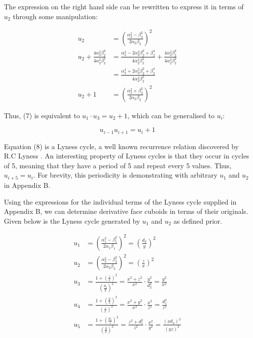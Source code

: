 \documentclass[11pt]{article}
\begin{document}
The expression on the right hand side can be rewritten to express it in terms of $u_2$ through some manipulation:

\begin{equation*}
\begin{aligned}
u_2&=\left(\frac{\alpha_2^2-\beta_2^2}{2\alpha_2\beta_2}\right)^2 \\
u_2+\frac{4\alpha_2^2\beta_2^2}{4\alpha_2^2\beta_2^2}&=\frac{\alpha_2^4-2\alpha_2^2\beta_2^2+\beta_2^4}{4\alpha_2^2\beta_2^2}+\frac{4\alpha_2^2\beta_2^2}{4\alpha_2^2\beta_2^2} \\
&=\frac{\alpha_2^4+2\alpha_2^2\beta_2^2+\beta_2^4}{4\alpha_2^2\beta_2^2} \\
u_2+1&=\left(\frac{\alpha_2^2+\beta_2^2}{2\alpha_2\beta_2}\right)^2
\end{aligned}
\end{equation*}

Thus, (7) is equivalent to $u_1\cdot{u_3}=u_2+1$, which can be generalised to $u_i$:

\begin{equation}
u_{i-1}u_{i+1}=u_i+1
\end{equation}

Equation (8) is a Lyness cycle, a well known recurrence relation discovered by R.C Lyness \cite{lyness}. An interesting property of Lyness cycles is that they occur in cycles of 5, meaning that they have a period of 5 and repeat every 5 values. Thus, $u_{i+5}=u_i$. For brevity, this periodicity is demonstrating with arbitrary $u_1$ and $u_2$ in Appendix B.

Using the expressions for the individual terms of the Lyness cycle supplied in Appendix B, we can determine derivative face cuboids in terms of their originals. Given below is the Lyness cycle generated by $u_1$ and $u_2$ as defined prior.

\begin{equation*}
\begin{aligned}
u_1&=\left(\frac{\alpha_1^2-\beta_1^2}{2\alpha_1\beta_1}\right)^2=\left(\frac{d_2}{y}\right)^2 \\
u_2&=\left(\frac{\alpha_2^2-\beta_2^2}{2\alpha_2\beta_2}\right)^2=\left(\frac{z}{x}\right)^2 \\
u_3&=\frac{1+\left(\frac{z}{x}\right)^2}{\left(\frac{d_2}{y}\right)^2}=\frac{x^2+z^2}{x^2}\cdot\frac{y^2}{d_2^2}=\frac{y^2}{x^2} \\
u_4&=\frac{1+\left(\frac{y}{x}\right)^2}{\left(\frac{z}{x}\right)^2}=\frac{x^2+y^2}{x^2}\cdot\frac{x^2}{z^2}=\frac{d_1^2}{z^2} \\
u_5&=\frac{1+\left(\frac{d_1}{z}\right)^2}{\left(\frac{y}{x}\right)^2}=\frac{z^2+d_1^2}{z^2}\cdot\frac{x^2}{y^2}=\frac{(xd_4)^2}{(yz)^2}
\end{aligned}
\end{equation*}
\end{document}

